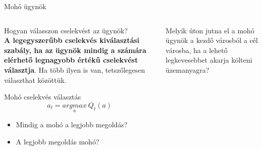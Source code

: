 \documentclass[english, aspectratio=169]{beamer}
\begin{document}
\begin{frame}{Mohó ügynök}
\begin{columns}
\begin{column}{.5\textwidth}
Hogyan válasszon cselekvést az ügynök?\\
\textbf{A legegyszerűbb cselekvés kiválasztási szabály, ha az ügynök mindig a számára elérhető legnagyobb értékű cselekvést választja}. Ha több ilyen is van, tetszőlegesen választhat közöttük. 
\begin{center}
\begin{block}{Mohó cselekvés választás}
\[
a_{t}=\underset{a}{argmax}\:Q_{t}(a)
\]
\end{block}
\begin{itemize}
	\item Mindig a mohó a legjobb megoldás?
	\item A legjobb megoldás mohó?
\end{itemize}
\end{center}
\end{column}
\begin{column}{.5\textwidth}
\begin{center}
\end{center}
Melyik úton jutna el a mohó ügynök a kezdő városból a cél városba, ha a lehető legkevesebbet akarja költeni üzemanyagra?
\end{column}
\end{columns}
\end{frame}
\end{document}
